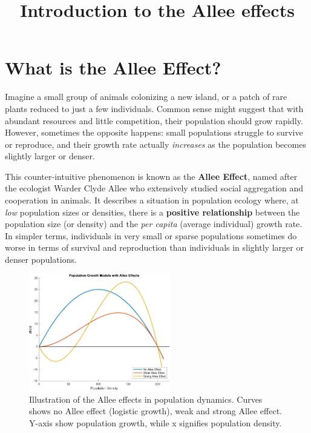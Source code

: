 \documentclass{article}
\title{Introduction to the Allee effects}
\begin{document}
\maketitle

\section{What is the Allee Effect?}
Imagine a small group of animals colonizing a new island, or a patch of rare plants reduced to just a few individuals. Common sense might suggest that with abundant resources and little competition, their population should grow rapidly. However, sometimes the opposite happens: small populations struggle to survive or reproduce, and their growth rate actually \emph{increases} as the population becomes slightly larger or denser.

This counter-intuitive phenomenon is known as the \textbf{Allee Effect}, named after the ecologist Warder Clyde Allee who extensively studied social aggregation and cooperation in animals. It describes a situation in population ecology where, at \emph{low} population sizes or densities, there is a \textbf{positive relationship} between the population size (or density) and the \emph{per capita} (average individual) growth rate. In simpler terms, individuals in very small or sparse populations sometimes do worse in terms of survival and reproduction than individuals in slightly larger or denser populations.

\begin{figure}[htbp]
  \centering
  \includegraphics[width=0.55\textwidth]{projects/allee_effect/images/allee_effects.pdf}
  \caption{Illustration of the Allee effects in population dynamics. Curves shows no Allee effect (logistic growth), weak and strong Allee effect. Y-axis show population growth, while x signifies population density.}
  \label{fig:allee-effects}
\end{figure}
\end{document}

